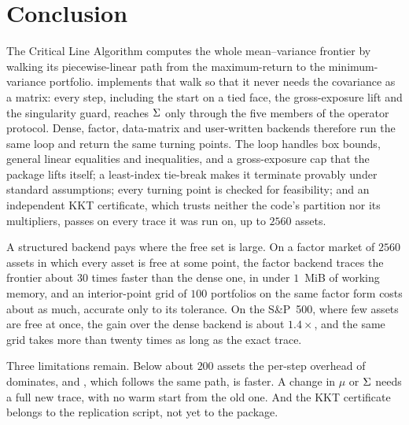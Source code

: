\section{Conclusion}

The Critical Line Algorithm computes the whole mean--variance frontier by walking its
piecewise-linear path from the maximum-return to the minimum-variance portfolio.
 implements that walk so that it never needs the covariance as a matrix:
every step, including the start on a tied face, the gross-exposure lift and the
singularity guard, reaches $\Sigma$ only through the five members of the 
operator protocol. Dense, factor, data-matrix and user-written backends therefore run
the same loop and return the same turning points. The loop handles box bounds, general
linear equalities and inequalities, and a gross-exposure cap that the package lifts
itself; a least-index tie-break makes it terminate provably under standard assumptions;
every turning point is checked for feasibility; and an independent KKT certificate,
which trusts neither the code's partition nor its multipliers, passes on every trace it
was run on, up to $2560$ assets.

A structured backend pays where the free set is large. On a factor market of $2560$
assets in which every asset is free at some point, the factor backend traces the
frontier about $30$ times faster than the dense one, in under $1$~MiB of working memory,
and an interior-point grid of $100$ portfolios on the same factor form costs about as
much, accurate only to its tolerance. On the S\&P~500, where few assets are free at
once, the gain over the dense backend is about $1.4\times$, and the same grid takes more
than twenty times as long as the exact trace.

Three limitations remain. Below about $200$ assets the per-step overhead of
 dominates, and , which follows the same path, is faster.
A change in $\mu$ or $\Sigma$ needs a full new trace, with no warm start from the old one.
And the KKT certificate belongs to the replication script, not yet to the package.
